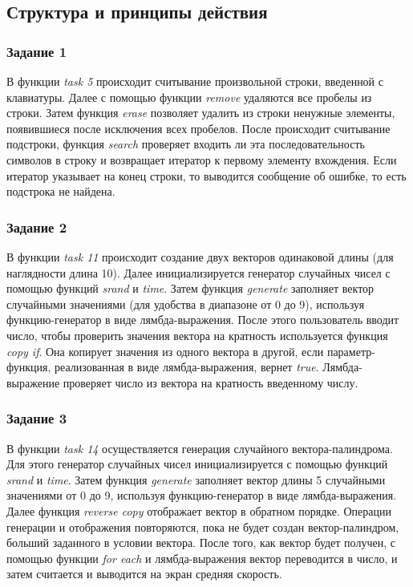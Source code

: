 \documentclass[a4paper,14pt]{article}
\begin{document}
\subsection{Структура и принципы действия}
\subsubsection{Задание 1}
В функции \textit{task 5} происходит считывание произвольной строки, введенной с клавиатуры. Далее с помощью функции \textit{remove} удаляются все пробелы из строки. Затем функция \textit{erase} позволяет удалить из строки ненужные элементы, появившиеся после исключения всех пробелов. После происходит считывание подстроки, функция \textit{search} проверяет входить ли эта последовательность символов в строку и возвращает итератор к первому элементу вхождения. Если итератор указывает на конец строки, то выводится сообщение об ошибке, то есть подстрока не найдена.

\subsubsection{Задание 2}
В функции \textit{task 11} происходит создание двух векторов одинаковой длины (для наглядности длина 10). Далее инициализируется генератор случайных чисел с помощью функций \textit{srand} и \textit{time}. Затем функция \textit{generate} заполняет вектор случайными значениями (для удобства в диапазоне от 0 до 9), используя функцию-генератор в виде лямбда-выражения. После этого пользователь вводит число, чтобы проверить значения вектора на кратность используется функция \textit{copy if}. Она копирует значения из одного вектора в другой, если параметр-функция, реализованная в виде лямбда-выражения, вернет \textit{true}. Лямбда-выражение проверяет число из вектора на кратность введенному числу.  

\subsubsection{Задание 3}
В функции \textit{task 14} осуществляется генерация случайного вектора-палиндрома. Для этого генератор случайных чисел инициализируется с помощью функций \textit{srand} и \textit{time}. Затем функция \textit{generate} заполняет вектор длины 5 случайными значениями от 0 до 9, используя функцию-генератор в виде лямбда-выражения. Далее функция \textit{reverse copy} отображает вектор в обратном порядке. Операции генерации и отображения повторяются, пока не будет создан вектор-палиндром, больший заданного в условии вектора. После того, как вектор будет получен, с помощью функции \textit{for each} и лямбда-выражения вектор переводится в число, и затем считается и выводится на экран средняя скорость.
\end{document}
